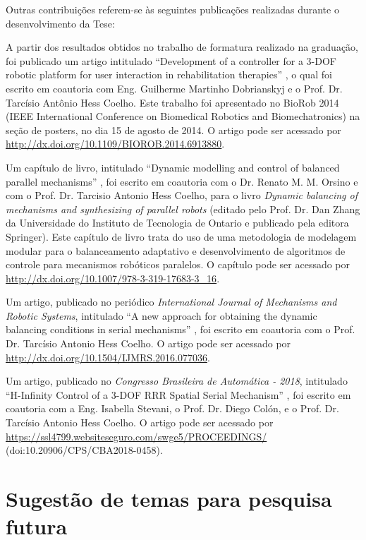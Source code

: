\documentclass[]{politex}
\begin{document}
Outras contribuições referem-se às seguintes publicações realizadas durante o desenvolvimento da Tese:

A partir dos resultados obtidos no trabalho de formatura realizado na gradua\c{c}\~ao, foi publicado um artigo intitulado ``Development of a controller for a 3-DOF robotic platform for user interaction in rehabilitation therapies'' \cite{Biorob}, o qual foi escrito em coautoria com Eng. Guilherme Martinho Dobrianskyj e o Prof. Dr. Tarc\'isio Ant\^onio Hess Coelho. Este trabalho foi apresentado no BioRob 2014 (IEEE International Conference on Biomedical Robotics and Biomechatronics) na se\c{c}\~ao de posters, no dia 15 de agosto de 2014. O artigo pode ser acessado por \url{http://dx.doi.org/10.1109/BIOROB.2014.6913880}.

Um cap\' itulo de livro, intitulado ``Dynamic modelling
and control of balanced parallel mechanisms'' \cite{22orsino}, foi escrito em coautoria com o Dr. Renato M. M. Orsino e com o Prof. Dr. Tarcisio Antonio Hess Coelho, para o livro {\em Dynamic balancing of mechanisms and synthesizing of parallel
robots}  (editado pelo Prof. Dr. Dan Zhang da Universidade do Instituto de Tecnologia
de Ontario e publicado pela editora Springer).
Este cap\'itulo de livro trata do uso de uma metodologia de modelagem modular para o
balanceamento adaptativo e desenvolvimento de algoritmos de controle para mecanismos
rob\'oticos paralelos. O capítulo pode ser acessado por \url{http://dx.doi.org/10.1007/978-3-319-17683-3_16}.

Um artigo, publicado no peri\'odico {\em International Journal of Mechanisms and Robotic Systems}, intitulado ``A new approach for obtaining the dynamic balancing conditions in serial mechanisms'' \cite{Coutinho}, foi escrito em coautoria com o Prof. Dr. Tarc\'isio Antonio Hess Coelho. O artigo pode ser acessado por \url{http://dx.doi.org/10.1504/IJMRS.2016.077036}.

Um artigo, publicado no {\em Congresso Brasileira de Automática - 2018}, intitulado ``H-Infinity Control of a 3-DOF RRR Spatial Serial Mechanism'' \cite{CBA}, foi escrito em coautoria com a Eng. Isabella Stevani, o Prof. Dr. Diego Colón, e o Prof. Dr. Tarc\'isio Antonio Hess Coelho. O artigo pode ser acessado por \url{https://ssl4799.websiteseguro.com/swge5/PROCEEDINGS/} (doi:10.20906/CPS/CBA2018-0458).

\section{Sugestão de temas para pesquisa futura}
\end{document}

